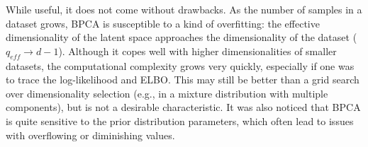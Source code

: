 \vspace{\baselineskip}
While useful, it does not come without drawbacks. As the number of samples in a dataset grows, BPCA is susceptible to a kind of overfitting: the effective dimensionality of the latent space approaches the dimensionality of the dataset ($q_{eff} \rightarrow d - 1$). Although it copes well with higher dimensionalities of smaller datasets, the computational complexity grows very quickly, especially if one was to trace the log-likelihood and ELBO. This may still be better than a grid search over dimensionality selection (e.g., in a mixture distribution with multiple components), but is not a desirable characteristic. It was also noticed that BPCA is quite sensitive to the prior distribution parameters, which often lead to issues with overflowing or diminishing values.


